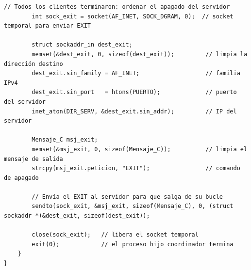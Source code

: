 \begin{lstlisting}[style=estiloC]
        // Todos los clientes terminaron: ordenar el apagado del servidor
        int sock_exit = socket(AF_INET, SOCK_DGRAM, 0);  // socket temporal para enviar EXIT

        struct sockaddr_in dest_exit;
        memset(&dest_exit, 0, sizeof(dest_exit));         // limpia la dirección destino
        dest_exit.sin_family = AF_INET;                   // familia IPv4
        dest_exit.sin_port   = htons(PUERTO);             // puerto del servidor
        inet_aton(DIR_SERV, &dest_exit.sin_addr);         // IP del servidor

        Mensaje_C msj_exit;
        memset(&msj_exit, 0, sizeof(Mensaje_C));          // limpia el mensaje de salida
        strcpy(msj_exit.peticion, "EXIT");                // comando de apagado

        // Envía el EXIT al servidor para que salga de su bucle
        sendto(sock_exit, &msj_exit, sizeof(Mensaje_C), 0, (struct sockaddr *)&dest_exit, sizeof(dest_exit));

        close(sock_exit);   // libera el socket temporal
        exit(0);            // el proceso hijo coordinador termina
    }
}
\end{lstlisting}